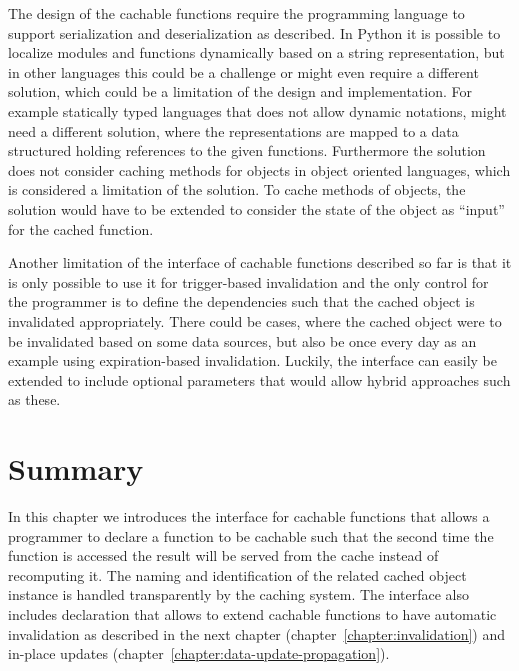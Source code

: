 The design of the cachable functions require the programming language to support serialization and deserialization as described. In Python it is possible to localize modules and functions dynamically based on a string representation, but in other languages this could be a challenge or might even require a different solution, which could be a limitation of the design and implementation. For example statically typed languages that does not allow dynamic notations, might need a different solution, where the representations are mapped to a data structured holding references to the given functions. Furthermore the solution does not consider caching methods for objects in object oriented languages, which is considered a limitation of the solution. To cache methods of objects, the solution would have to be extended to consider the state of the object as ``input'' for the cached function.

Another limitation of the interface of cachable functions described so far is that it is only possible to use it for trigger-based invalidation and the only control for the programmer is to define the dependencies such that the cached object is invalidated appropriately. There could be cases, where the cached object were to be invalidated based on some data sources, but also be once every day as an example using expiration-based invalidation. Luckily, the interface can easily be extended to include optional parameters that would allow hybrid approaches such as these.


\section{Summary}
\label{sec:cachable-functions-summary}

In this chapter we introduces the interface for cachable functions that allows a programmer to declare a function to be cachable such that the second time the function is accessed the result will be served from the cache instead of recomputing it. The naming and identification of the related cached object instance is handled transparently by the caching system. The interface also includes declaration that allows to extend cachable functions to have automatic invalidation as described in the next chapter (chapter~\ref{chapter:invalidation}) and in-place updates (chapter~\ref{chapter:data-update-propagation}).


